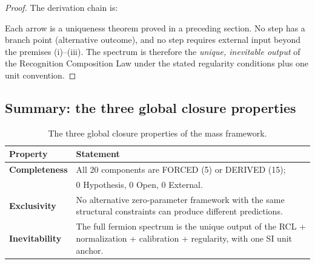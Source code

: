 \documentclass[11pt,a4paper]{article}
\theoremstyle{definition}
\theoremstyle{remark}
\newcommand{\phig}{\varphi}
\newcommand{\Jcost}{J}
\newcommand{\Epass}{E_{\mathrm{passive}}}
\newcommand{\Zidx}{Z}
\begin{document}
\begin{proof}
The derivation chain is:
\begin{center}
\end{center}

Each arrow is a uniqueness theorem proved in a preceding section.
No step has a branch point (alternative outcome), and no step requires
external input beyond the premises (i)--(iii).  The spectrum is therefore
the \emph{unique, inevitable output} of the Recognition Composition Law
under the stated regularity conditions plus one unit convention.
\end{proof}

\subsection{Summary: the three global closure properties}

\begin{table}[h]
\centering
\caption{The three global closure properties of the mass framework.}
\label{tab:closure_summary}
\begin{tabular}{@{}lp{8cm}@{}}
\toprule
Property & Statement \\
\midrule
\textbf{Completeness} &
  All 20 components are FORCED (5) or DERIVED (15); \\
  & 0 Hypothesis, 0 Open, 0 External. \\[3pt]
\textbf{Exclusivity} &
  No alternative zero-parameter framework with the same structural
  constraints can produce different predictions. \\[3pt]
\textbf{Inevitability} &
  The full fermion spectrum is the unique output of the RCL + normalization
  + calibration + regularity, with one SI unit anchor. \\
\bottomrule
\end{tabular}
\end{table}
\end{document}
